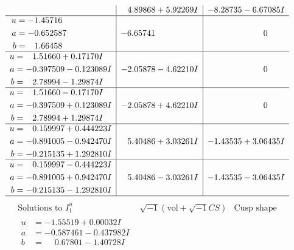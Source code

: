 \documentclass[1p]{elsarticle_modified}
\theoremstyle{definition}
\newcommand{\I}{\sqrt{-1}}
\begin{document}
$$\begin{array}{c|c|c}
 & \phantom{-}4.89868 + 5.92269 I & -8.28735 - 6.67085 I \\ \hline\begin{aligned}
u &= -1.45716\phantom{ +0.000000I} \\
a &= -0.652587\phantom{ +0.000000I} \\
b &= \phantom{-}1.66458\phantom{ +0.000000I}\end{aligned}
 & -6.65741\phantom{ +0.000000I} & \phantom{-0.000000 } 0 \\ \hline\begin{aligned}
u &= \phantom{-}1.51660 + 0.17170 I \\
a &= -0.397509 - 0.123089 I \\
b &= \phantom{-}2.78994 - 1.29874 I\end{aligned}
 & -2.05878 - 4.62210 I & \phantom{-0.000000 } 0 \\ \hline\begin{aligned}
u &= \phantom{-}1.51660 - 0.17170 I \\
a &= -0.397509 + 0.123089 I \\
b &= \phantom{-}2.78994 + 1.29874 I\end{aligned}
 & -2.05878 + 4.62210 I & \phantom{-0.000000 } 0 \\ \hline\begin{aligned}
u &= \phantom{-}0.159997 + 0.444223 I \\
a &= -0.891005 - 0.942470 I \\
b &= -0.215135 + 1.292810 I\end{aligned}
 & \phantom{-}5.40486 + 3.03261 I & -1.43535 + 3.06435 I \\ \hline\begin{aligned}
u &= \phantom{-}0.159997 - 0.444223 I \\
a &= -0.891005 + 0.942470 I \\
b &= -0.215135 - 1.292810 I\end{aligned}
 & \phantom{-}5.40486 - 3.03261 I & -1.43535 - 3.06435 I\\
 \hline 
 \end{array}$$\newpage$$\begin{array}{c|c|c}  
\text{Solutions to }I^u_{1}& \I (\text{vol} + \sqrt{-1}CS) & \text{Cusp shape}\\
 \hline 
\begin{aligned}
u &= -1.55519 + 0.00032 I \\
a &= -0.587461 - 0.437982 I \\
b &= \phantom{-}0.67801 - 1.40728 I\end{aligned}

\end{array}$$
\end{document}
